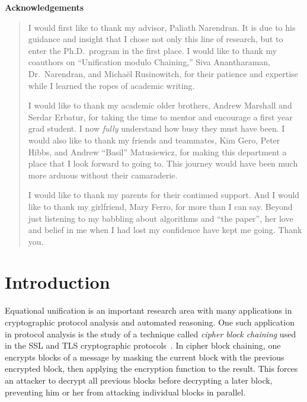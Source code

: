 \documentclass[11pt]{article}
\begin{document}
\clearpage

\begin{center}
    \textbf{Acknowledgements}
\end{center}
\begin{quotation}
I would first like to thank my advisor, Paliath Narendran. It is due to his
guidance and insight that I chose not only this line of research, but to enter
the Ph.D.\ program in the first place.
I would like to thank my coauthors on ``Unification modulo Chaining,'' Siva
Anantharaman, Dr.\ Narendran, and Micha\"{e}l Rusinowitch, for their patience
and expertise while I learned the ropes of academic writing.

I would like to thank my academic older brothers, Andrew Marshall and Serdar
Erbatur, for taking the time to mentor and encourage a first year grad student.
I now \emph{ful{}ly} understand how busy they must have been.
I would also like to thank my friends and teammates, Kim Gero, Peter Hibbs, and
Andrew ``Basil'' Matusiewicz, for making this department a place that I look
forward to going to. This journey would have been much more arduous without
their camaraderie.

I would like to thank my parents for their continued support.
And I would like to thank my girlfriend, Mary Ferro, for more than I can say.
Beyond just listening to my babbling about algorithms and ``the paper'', her
love and belief in me when I had lost my confidence have kept me going. Thank
you.
\end{quotation}

\cleardoublepage
\tableofcontents

\clearpage
{}

\section{Introduction}\label{section:intro}

Equational unification is an important research area with many applications in
cryptographic protocol analysis and automated reasoning. One such application
in protocol analysis is the study of a technique called \emph{cipher block
chaining} used in the SSL and TLS cryptographic protocols~\cite{rfc5246}. In
cipher block chaining, one encrypts blocks of a message by masking the current
block with the previous encrypted block, then applying the encryption function
to the result. This forces an attacker to decrypt all previous blocks before
decrypting a later block, preventing him or her from attacking individual
blocks in parallel.
\end{document}
